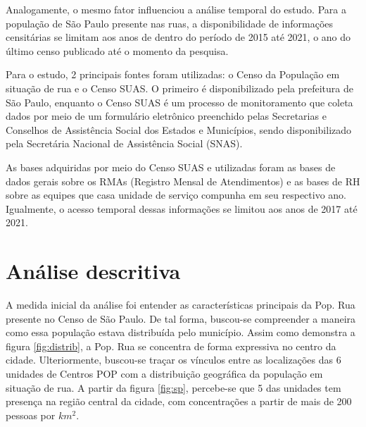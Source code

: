 Analogamente, o mesmo fator influenciou a análise temporal do estudo. Para a população de São Paulo presente nas ruas, a disponibilidade de informações censitárias se limitam aos anos de dentro do período de 2015 até 2021, o ano do último censo publicado até o momento da pesquisa. 

Para o estudo, 2 principais fontes foram utilizadas: o Censo da População em situação de rua e o Censo SUAS. O primeiro é disponibilizado pela prefeitura de São Paulo, enquanto o Censo SUAS é um processo de monitoramento que coleta dados por meio de um formulário eletrônico preenchido pelas Secretarias e Conselhos de Assistência Social dos Estados e Municípios, sendo disponibilizado pela Secretária Nacional de Assistência Social (SNAS). 

As bases adquiridas por meio do Censo SUAS e utilizadas foram as bases de dados gerais sobre os RMAs (Registro Mensal de Atendimentos) e as bases de RH sobre as equipes que casa unidade de serviço compunha em seu respectivo ano. Igualmente, o acesso temporal dessas informações se limitou aos anos de 2017 até 2021. 

\section{Análise descritiva}\label{anades}

A medida inicial da análise foi entender as características principais da Pop. Rua presente no Censo de São Paulo. De tal forma, buscou-se compreender a maneira como essa população estava distribuída pelo município. Assim como demonstra a figura \ref{fig:distrib}, a Pop. Rua se concentra de forma expressiva no centro da cidade. Ulteriormente, buscou-se traçar os vínculos entre as localizações das 6 unidades de Centros POP com a distribuição geográfica da população em situação de rua. A partir da figura \ref{fig:sp}, percebe-se que 5 das unidades tem presença na região central da cidade, com concentrações a partir de mais de 200 pessoas por $km^2$. 

